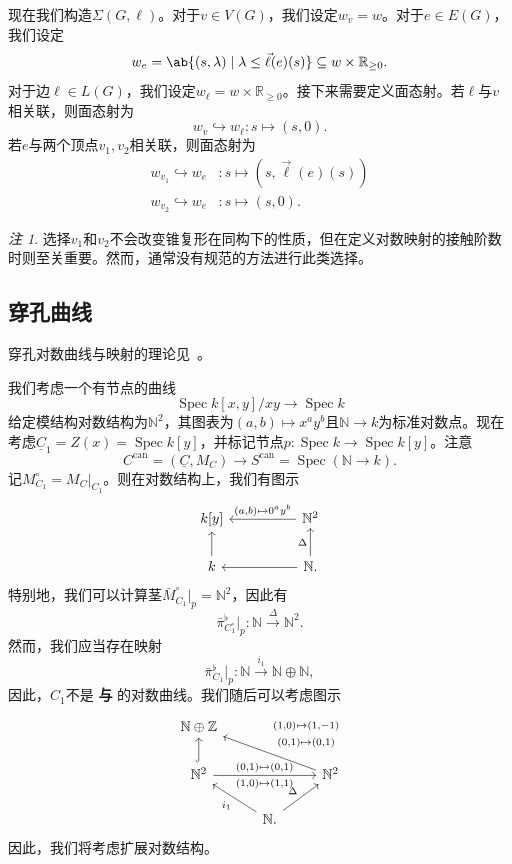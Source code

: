 \documentclass{amsart}
\theoremstyle{definition}
\theoremstyle{remark}
\newtheorem{rmk}[thm]{注}
\theoremstyle{plain}
\theoremstyle{definition}
\theoremstyle{remark}
\newcommand{\N}{\mathbb{N}}
\newcommand{\R}{\mathbb{R}}
\newcommand{\Z}{\mathbb{Z}}
\newcommand{\on}[1]{\operatorname{#1}}
\newcommand{\ul}[1]{\underline{#1}}
\newcommand{\1}{\mathbf{1}}
\newcommand{\2}{\mathbf{2}}
\newcommand{\3}{\mathbf{3}}
\DeclareMathOperator{\Spec}{Spec}
\begin{document}
现在我们构造\(\Sigma(G, \ell)\)。对于\(v \in V(G)\)，我们设定\(w_v = w\)。对于\(e \in E(G)\)，我们设定
\[ w_e = \ab\{ (s, \lambda) \mid \lambda \leq \vec{\ell}(e)(s) \} \subseteq w \times \R_{\geq 0}. \]
对于边\(\ell \in L(G)\)，我们设定\(w_{\ell} = w \times \R_{\geq 0}\)。接下来需要定义面态射。若\(\ell\)与\(v\)相关联，则面态射为
\[ w_v \hookrightarrow w_{\ell} \colon s \mapsto (s, 0). \]
若\(e\)与两个顶点\(v_1, v_2\)相关联，则面态射为
\begin{align*}
    w_{v_1} \hookrightarrow w_e &\colon s \mapsto (s, \vec{\ell}(e)(s)) \\
    w_{v_2} \hookrightarrow w_e & \colon s \mapsto (s, 0).
\end{align*}
\begin{rmk}
    选择\(v_1\)和\(v_2\)不会改变锥复形在同构下的性质，但在定义对数映射的接触阶数时则至关重要。然而，通常没有规范的方法进行此类选择。
\end{rmk}

\subsection{穿孔曲线}%
\label{sub:Punctured curves}

穿孔对数曲线与映射的理论见~\cite{ACGS2025}。

我们考虑一个有节点的曲线
\[ \Spec k[x,y]/xy \to \Spec k \]
给定模结构对数结构为\(\N^2\)，其图表为\((a,b) \mapsto x^a y^b\)且\(\N \to k\)为标准对数点。现在考虑\(\ul{C}_1 = Z(x) = \Spec k[y]\)，并标记节点\(p \colon \Spec k \to \Spec k[y]\)。注意
\[ C^{\on{can}} = (\ul{C}, M_C) \to S^{\on{can}} = \Spec(\N \to k). \]
记\(M_{C_1}^{\circ} = M_C|_{C_1}\)。则在对数结构上，我们有图示
\begin{equation*}
\begin{tikzcd}
    k[y] & & \N^2 \ar{ll}[swap]{(a,b) \mapsto 0^a y^b} \\
    k \ar{u} & & \N \ar{ll} \ar{u}{\Delta}.
\end{tikzcd}
\end{equation*}
特别地，我们可以计算茎\(\bar{M}_{C_1}^{\circ}|_p = \N^2\)，因此有
\[ \bar{\pi}_{C_1^{\circ}}^{\flat} |_p \colon \N \xrightarrow{\Delta} \N^2. \]
然而，我们应当存在映射
\[ \bar{\pi}^{\flat}_{C_1}|_p \colon \N \xrightarrow{i_1} \N \oplus \N, \]
因此，\(C_1\)不是 \textbf{ 与 } 的对数曲线。我们随后可以考虑图示
\begin{equation*}
\begin{tikzcd}
    \N \oplus \Z \\
    \N^2 \ar[hookrightarrow]{u} \ar{rr}{(0,1)\mapsto (0,1)}[swap]{(1,0)\mapsto (1,1)} & & \N^2 \ar{ull}[swap]{\Vectorstack{{(1,0)\mapsto(1,-1)} {(0,1)\mapsto(0,1)}}} \\
    & \N \ar{ul}{i_1} \ar{ur}{\Delta}.
\end{tikzcd}
\end{equation*}
因此，我们将考虑扩展对数结构。
\end{document}
